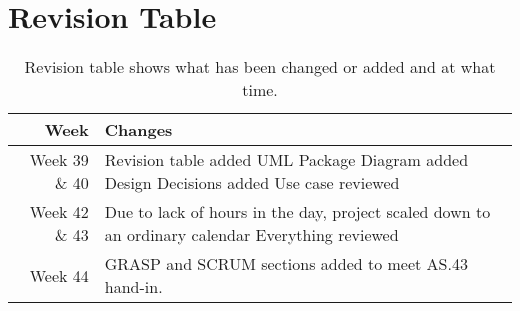 \section{Revision Table}
\begin{table*}[ht]\centering
  \begin{tabularx}{\textwidth}{@{}rX@{}}
    \toprule
    \textbf{Week} & \textbf{Changes} \\\hline
    Week 39 \& 40 & Revision table added\newline  
		    		UML Package Diagram added\newline
		    		Design Decisions added\newline
		    		Use case reviewed\\\hline
	Week 42 \& 43 & Due to lack of hours in the day, project scaled down to an ordinary calendar \newline
					Everything reviewed\\\hline
	Week 44		  & GRASP and SCRUM sections added to meet AS.43 hand-in.\\
    \bottomrule
  \end{tabularx}
  \caption{Revision table shows what has been changed or added and at what time.}
\end{table*}
\newpage